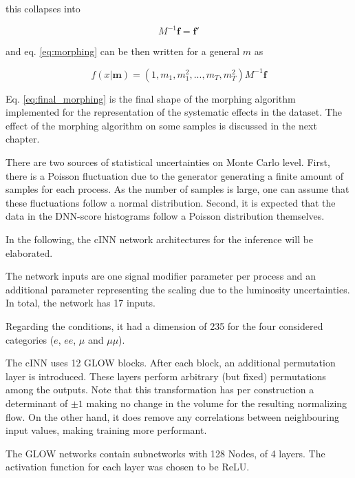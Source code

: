 this collapses into

\begin{equation*}
	M^{-1}\mathbf{f} = \mathbf{f}'
\end{equation*}

and eq. \ref{eq:morphing} can be then written for a general $m$ as

\begin{equation}
	f(x|\mathbf{m}) = (1, m_1, m_1^2, ..., m_T, m^2_T) M^{-1}\mathbf{f}
	\label{eq:final_morphing}
\end{equation}

Eq. \ref{eq:final_morphing} is the final shape of the morphing algorithm implemented for the representation of the systematic effects in the dataset. The effect of the morphing algorithm on some samples is discussed in the next chapter.

\Subsubsection{\textcolor{red}{Systematic Uncertainty Representation}}


There are two sources of statistical uncertainties on Monte Carlo level. First, there is a Poisson fluctuation due to the generator generating a finite amount of samples for each process. As the number of samples is large, one can assume that these fluctuations follow a normal distribution. Second, it is expected that the data in the DNN-score histograms follow a Poisson distribution themselves.



In the following, the cINN network architectures for the inference will be elaborated.

The network inputs are one signal modifier parameter per process and an additional parameter representing the scaling due to the luminosity uncertainties. In total, the network has 17 inputs.

Regarding the conditions, it had a dimension of 235 for the four considered categories ($e$, $ee$, $\mu$ and $\mu\mu$).

The cINN uses 12 GLOW blocks. After each block, an additional permutation layer is introduced. These layers perform arbitrary (but fixed) permutations among the outputs. Note that this transformation has per construction a determinant of $\pm1$ making no change in the volume for the resulting normalizing flow. On the other hand, it does remove any correlations between neighbouring input values, making training more performant.

The GLOW networks contain subnetworks with 128 Nodes, of 4 layers. The activation function for each layer was chosen to be ReLU.


